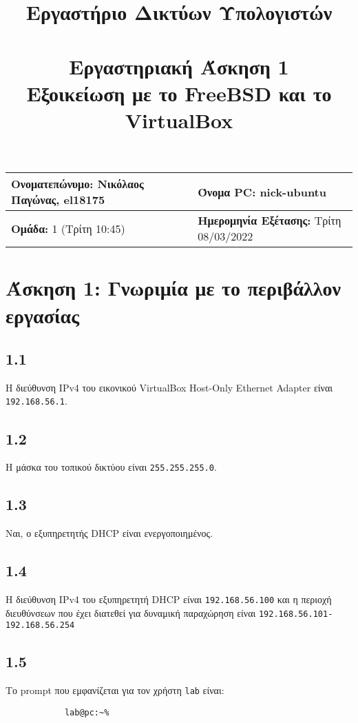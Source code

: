 \documentclass[a4paper, 12pt]{article}
\title{
	\textbf{Εργαστήριο Δικτύων Υπολογιστών} \\~\\
	Εργαστηριακή Άσκηση 1 \\ 
	Εξοικείωση με το FreeBSD και το VirtualBox
}
\author{}
\date{}
\begin{document}
	\maketitle
	\begin{center}
	\begin{tabular}{|l|l|}
		\hline
		\textbf{Ονοματεπώνυμο:} Νικόλαος Παγώνας, el18175  & \textbf{Όνομα PC:} nick-ubuntu \\
		\hline
		\textbf{Ομάδα:} 1 (Τρίτη 10:45) & \textbf{Ημερομηνία Εξέτασης:} Τρίτη 08/03/2022 \\
		\hline
	\end{tabular}
	\end{center}

\section*{Άσκηση 1: Γνωριμία με το περιβάλλον εργασίας}
	\subsection*{1.1}
		Η διεύθυνση IPv4 του εικονικού VirtualBox Host-Only Ethernet Adapter είναι \verb|192.168.56.1|.
		
	\subsection*{1.2}
		Η μάσκα του τοπικού δικτύου είναι \verb|255.255.255.0|.
	
	\subsection*{1.3}
		Ναι, ο εξυπηρετητής DHCP είναι ενεργοποιημένος.
	
	\subsection*{1.4}
		Η διεύθυνση IPv4 του εξυπηρετητή DHCP είναι \verb|192.168.56.100| και η περιοχή διευθύνσεων που έχει διατεθεί για δυναμική παραχώρηση είναι \verb|192.168.56.101-192.168.56.254|
		
	\subsection*{1.5}
		Το prompt που εμφανίζεται για τον χρήστη \verb|lab| είναι:
		
		\begin{verbatim}
			lab@pc:~%
		\end{verbatim}
	
\end{document}
